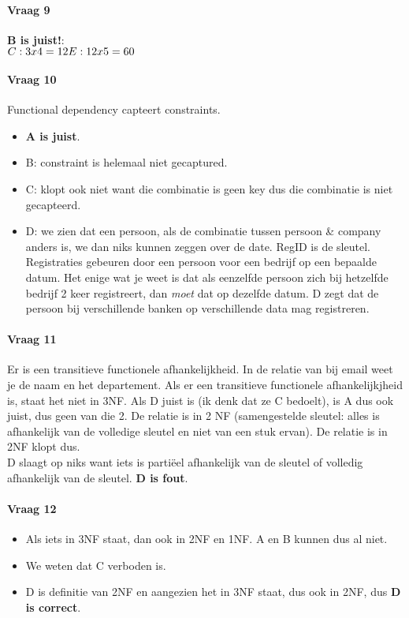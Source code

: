 \documentclass[10pt,a4paper]{report}
\begin{document}
\paragraph{Vraag 9}\textbf{B is juist!}:\\
$C:3x4=12\\
E:12x5=60$

\paragraph{Vraag 10}Functional dependency capteert constraints.
\begin{itemize}
\item \textbf{A is juist}.
\item B: constraint is helemaal niet gecaptured.
\item C: klopt ook niet want die combinatie is geen key dus die combinatie is niet gecapteerd.
\item D: we zien dat een persoon, als de combinatie tussen persoon \& company anders is, we dan niks kunnen zeggen over de date.
RegID is de sleutel. Registraties gebeuren door een persoon voor een bedrijf op een bepaalde datum. Het enige wat je weet is dat als eenzelfde persoon zich bij hetzelfde bedrijf 2 keer registreert, dan \emph{moet} dat op dezelfde datum. D zegt dat de persoon bij verschillende banken op verschillende data mag registreren.
\end{itemize}

\paragraph{Vraag 11}Er is een transitieve functionele afhankelijkheid. In de relatie van bij email weet je de naam en het departement. Als er een transitieve functionele afhankelijkjheid is, staat het niet in 3NF. Als D juist is (ik denk dat ze C bedoelt), is A dus ook juist, dus geen van die 2. De relatie is in 2 NF (samengestelde sleutel: alles is afhankelijk van de volledige sleutel en niet van een stuk ervan). De relatie is in 2NF klopt dus.\\
D slaagt op niks want iets is parti\"eel afhankelijk van de sleutel of volledig afhankelijk van de sleutel. \textbf{D is fout}.

\paragraph{Vraag 12}
\begin{itemize}
\item Als iets in 3NF staat, dan ook in 2NF en 1NF. A en B kunnen dus al niet.
\item We weten dat C verboden is.
\item D is definitie van 2NF en aangezien het in 3NF staat, dus ook in 2NF, dus \textbf{D is correct}.
\end{itemize}
\end{document}
